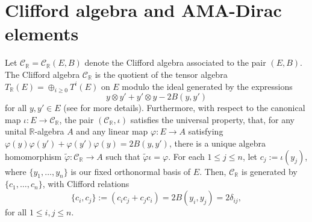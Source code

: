 \documentclass[pdftex]{sigma}
\numberwithin{equation}{section}
\newcommand{\bbr}{\mathbb{R}}
\begin{document}
\section{Clifford algebra and AMA-Dirac elements}\label{s:Cliff}
Let $\mathcal{C}_\bbr = \mathcal{C}_\bbr(E,B)$ denote the Clifford algebra associated to the pair $(E,B)$.
The Clifford algebra $\mathcal{C}_\bbr$ is the quotient of the tensor algebra $T_\bbr(E) = \oplus_{i\geq 0} T^i(E)$ on $E$ modulo the ideal generated by
the expressions
\[y\otimes y' + y'\otimes y - 2 B(y,y')\]
for all $y,y'\in E$ (see \cite{M76} for more details). Furthermore, with respect to the canonical map $\iota\colon E\to\mathcal{C}_\bbr$, the pair $(\mathcal{C}_\bbr,\iota)$ satisfies the universal property, that, for any unital $\mathbb{R}$-algebra $A$ and any linear map $\varphi\colon E\to A$ satisfying $\varphi(y)\varphi(y') + \varphi(y')\varphi(y) = 2B(y,y')$, there is a unique algebra homomorphism $\tilde\varphi\colon \mathcal{C}_\bbr\to A$ such that $\tilde\varphi\iota = \varphi.$ For each $1\leq j \leq n$, let $c_j := \iota(y_j)$, where $\{y_1,\dots,y_n\}$ is our fixed orthonormal basis of $E$. Then, $\mathcal{C}_\bbr$ is generated by $\{c_1,\dots,c_n\}$, with Clifford relations
\begin{equation}\label{e:CliffRel}
 \{c_i,c_j\} := (c_ic_j + c_jc_i) = 2B(y_i,y_j) = 2\delta_{ij},
\end{equation}
for all $1\leq i,j\leq n$.
\end{document}

